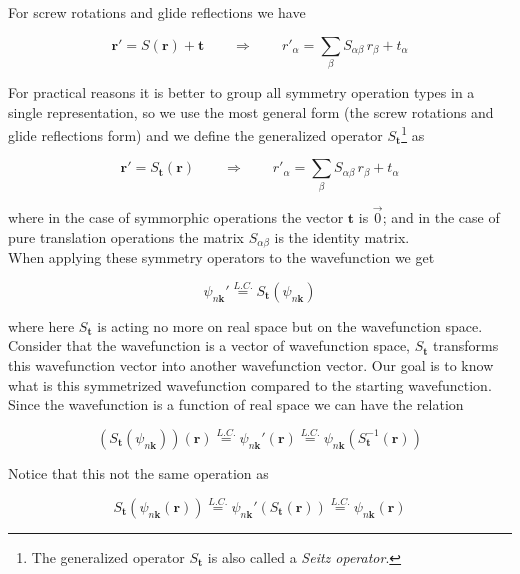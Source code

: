 \documentclass[a4paper,12pt]{report}
\begin{document}
For screw rotations and glide reflections we have

\begin{equation}
\mathbf{r}'= S(\mathbf{r})+\mathbf{t} \qquad \Rightarrow \qquad r'_{\alpha} = \sum_{\beta} S_{\alpha\beta}\, r_{\beta} + t_{\alpha}
\end{equation}

For practical reasons it is better to group all symmetry operation types in a single representation, so we use the most general form (the screw rotations and glide reflections form) and we define the generalized operator $S_{\mathbf{t}}$\footnote{The generalized operator $S_{\mathbf{t}}$ is also called a \textit{Seitz operator}.} as

\begin{equation}
\mathbf{r}'= S_{\mathbf{t}}(\mathbf{r}) \qquad \Rightarrow \qquad r'_{\alpha} = \sum_{\beta} S_{\alpha\beta} \,r_{\beta} + t_{\alpha} \label{eqStdef}
\end{equation}

where in the case of symmorphic operations the vector $\mathbf{t}$ is $\overrightarrow{0}$; and in the case of pure translation operations the matrix $S_{\alpha\beta}$ is the identity matrix.\\
When applying these symmetry operators to the wavefunction we get

\begin{equation}
\psi_{n\mathbf{k}}' \stackrel{L.C.}{=} S_{\mathbf{t}} \left( \psi_{n\mathbf{k}}\right)
\end{equation}

where here $S_{\mathbf{t}}$ is acting no more on real space but on the wavefunction space. Consider that the wavefunction is a vector of wavefunction space, $S_{\mathbf{t}}$ transforms this wavefunction vector into another wavefunction vector. Our goal is to know what is this symmetrized wavefunction compared to the starting wavefunction. Since the wavefunction is a function of real space we can have the relation

\begin{equation}
\left(S_{\mathbf{t}} \left( \psi_{n\mathbf{k}}\right) \right)(\mathbf{r}) \stackrel{L.C.}{=} \psi_{n\mathbf{k}}' (\mathbf{r}) \stackrel{L.C.}{=} \psi_{n\mathbf{k}}(S_{\mathbf{t}}^{-1}\left( \mathbf{r}\right) ) \label{eqs-1}
\end{equation}

Notice that this not the same operation as

\begin{equation}
S_{\mathbf{t}} \left( \psi_{n\mathbf{k}}(\mathbf{r})\right) \stackrel{L.C.}{=} \psi_{n\mathbf{k}}' (S_{\mathbf{t}}(\mathbf{r})) \stackrel{L.C.}{=} \psi_{n\mathbf{k}}( \mathbf{r})
\end{equation}
\end{document}
